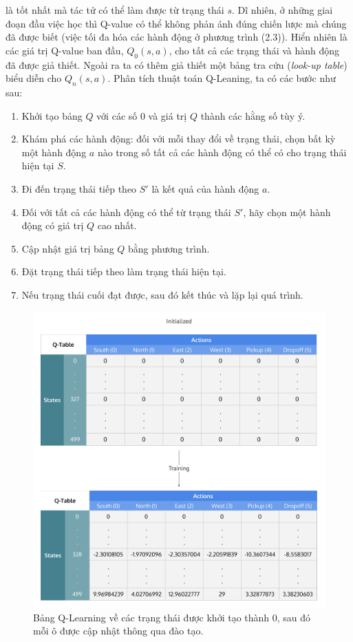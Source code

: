 \documentclass[12pt,a4paper]{report}
\begin{document}
là tốt nhất mà tác tử có thể làm được từ trạng thái $s$. Dĩ nhiên, ở những giai đoạn đầu việc học
thì Q-value có thể không phản ánh đúng chiến lược mà chúng đã được biết (việc tối đa hóa
các hành động ở phương trình (2.3)). Hiển nhiên là các giá trị Q-value ban đầu, $Q_0(s, a)$, cho
tất cả các trạng thái và hành động đã được giả thiết. Ngoài ra ta có thêm giả thiết một bảng
tra cứu (\textit{look-up table}) biểu diễn cho $Q_n(s, a)$. Phân tích thuật toán Q-Leaning, ta có các bước như sau: \begin{enumerate}
	\item Khởi tạo bảng $Q$ với các số 0 và giá trị $Q$ thành các hằng số tùy ý.
	\item Khám phá các hành động: đối với mỗi thay đổi về trạng thái, chọn bất kỳ một hành
	động $a$ nào trong số tất cả các hành động có thể có cho trạng thái hiện tại $S$.
	\item Đi đến trạng thái tiếp theo $S'$ là kết quả của hành động $a$.
	\item Đối với tất cả các hành động có thể từ trạng thái $S'$, hãy chọn một hành động có
	giá trị $Q$ cao nhất.
	\item Cập nhật giá trị bảng $Q$ bằng phương trình.
	\item  Đặt trạng thái tiếp theo làm trạng thái hiện tại.
	\item Nếu trạng thái cuối đạt được, sau đó kết thúc và lặp lại quá trình.
\end{enumerate} 
\begin{figure}[h]
	\centering
	\includegraphics[scale=.3]{3}
	\caption{Bảng Q-Learning về các trạng thái được khởi tạo thành 0, sau đó mỗi ô được cập nhật thông qua đào tạo.}
\end{figure}
\end{document}
